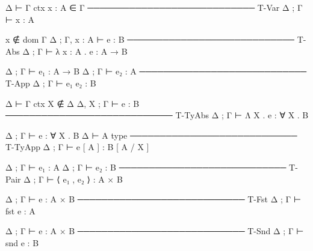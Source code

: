 \documentclass{article}
\begin{document}
\begin{inference}[rule_set=System F typing]
Δ ⊢ Γ ctx
x : A ∈ Γ
──────────────────────────── T-Var
Δ ; Γ ⊢ x : A

x ∉ dom Γ
Δ ; Γ, x : A ⊢ e : B
──────────────────────────── T-Abs
Δ ; Γ ⊢ λ x : A . e : A → B

Δ ; Γ ⊢ e₁ : A → B
Δ ; Γ ⊢ e₂ : A
──────────────────────────── T-App
Δ ; Γ ⊢ e₁ e₂ : B

Δ ⊢ Γ ctx
X ∉ Δ
Δ, X ; Γ ⊢ e : B
──────────────────────────── T-TyAbs
Δ ; Γ ⊢ Λ X . e : ∀ X . B

Δ ; Γ ⊢ e : ∀ X . B
Δ ⊢ A type
──────────────────────────── T-TyApp
Δ ; Γ ⊢ e [ A ] : B [ A / X ]

Δ ; Γ ⊢ e₁ : A
Δ ; Γ ⊢ e₂ : B
──────────────────────────── T-Pair
Δ ; Γ ⊢ ⟨ e₁ , e₂ ⟩ : A × B

Δ ; Γ ⊢ e : A × B
──────────────────────────── T-Fst
Δ ; Γ ⊢ fst e : A

Δ ; Γ ⊢ e : A × B
──────────────────────────── T-Snd
Δ ; Γ ⊢ snd e : B
\end{inference}
\end{document}
